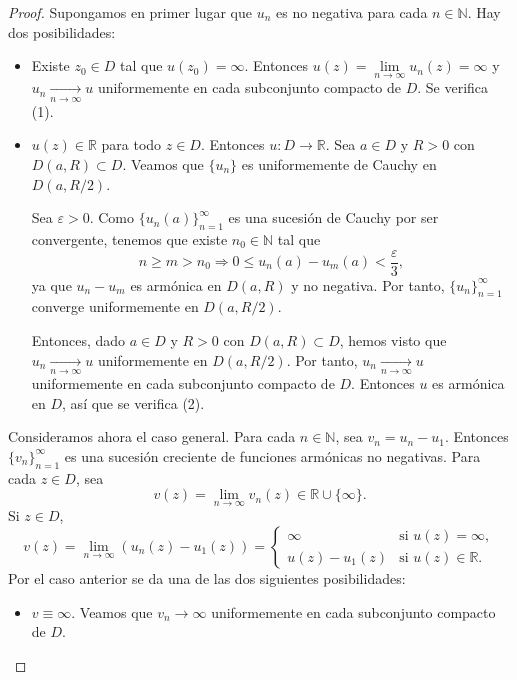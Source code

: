 \begin{proof}
    Supongamos en primer lugar que $u_n$ es no negativa para cada $n \in \mathbb{N}$.
    Hay dos posibilidades:
    \begin{itemize}
        \item Existe $z_0 \in D$ tal que $u(z_0) = \infty$.
              Entonces $u(z) = \lim\limits_{n \to \infty} u_n(z) = \infty$ y $u_n \xrightarrow[n \to \infty]{} u$ uniformemente en cada subconjunto compacto de $D$.
              Se verifica (1).

        \item $u(z) \in \mathbb{R}$ para todo $z \in D$.
              Entonces $u: D \to \mathbb{R}$.
              Sea $a \in D$ y $R > 0$ con $D(a, R) \subset D$.
              Veamos que $\{u_n\}$ es uniformemente de Cauchy en $D(a, R/2)$.

              Sea $\varepsilon > 0$.
              Como $\{u_n(a)\}_{n=1}^\infty$ es una sucesión de Cauchy por ser convergente, tenemos que existe $n_0 \in \mathbb{N}$ tal que
              $$n \geq m > n_0 \Rightarrow 0 \leq u_n(a)-u_m(a) < \frac{\varepsilon}{3},$$
              ya que $u_n-u_m$ es armónica en $D(a, R)$ y no negativa.
              Por tanto, $\{u_n\}_{n=1}^\infty$ converge uniformemente en $D(a, R/2)$.

              Entonces, dado $a \in D$ y $R > 0$ con $D(a, R) \subset D$, hemos visto que $u_n \xrightarrow[n \to \infty]{} u$ uniformemente en $D(a, R/2)$.
              Por tanto, $u_n \xrightarrow[n \to \infty]{} u$ uniformemente en cada subconjunto compacto de $D$.
              Entonces $u$ es armónica en $D$, así que se verifica (2).
    \end{itemize}

    Consideramos ahora el caso general.
    Para cada $n \in \mathbb{N}$, sea $v_n = u_n - u_1$.
    Entonces $\{v_n\}_{n=1}^\infty$ es una sucesión creciente de funciones armónicas no negativas.
    Para cada $z \in D$, sea
    $$v(z) = \lim\limits_{n \to \infty} v_n(z) \in \mathbb{R} \cup \{\infty\}.$$
    Si $z \in D$,
    $$v(z) = \lim\limits_{n \to \infty} (u_n(z)-u_1(z)) = \begin{cases}
            \infty        & \text{si } u(z) = \infty,       \\
            u(z) - u_1(z) & \text{si } u(z) \in \mathbb{R}.
        \end{cases}$$
    Por el caso anterior se da una de las dos siguientes posibilidades:
    \begin{itemize}
        \item $v \equiv \infty$.
              Veamos que $v_n \to \infty$ uniformemente en cada subconjunto compacto de $D$.


\end{itemize}
\end{proof}
